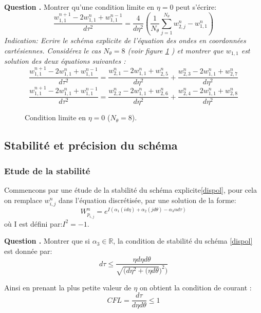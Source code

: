 \documentclass[a4,12pt]{article}
\newcounter{Nbquestion}
\newcommand*\question{%
\stepcounter{Nbquestion}%
\textbf{Question \theNbquestion. }}
\begin{document}
\begin{mdframed}[style=exampledefault]
\question Montrer qu'une condition limite en $\eta=0$ peut s'écrire:
\[
\dfrac{w_{1,1}^{n+1}-2 w_{1,1}^{n}+ w_{1,1}^{n-1}}{d\tau^2}=\dfrac{4}{d \eta^2}\left(\frac{1}{N_\theta} \sum_{j=1}^{N_\theta} w_{2,j}^n-w_{1,1}^{n}\right)
\]
\textit{Indication: Ecrire le schéma explicite de l'équation des ondes en coordonnées cartésiennes. Considérez le cas $N_\theta=8$ (voir figure \ref{fig:pol}  )
et montrer que $w_{1,1}$ est solution des deux équations suivantes :
$$\frac{w_{1,1}^{n+1}-2w_{1,1}^{n}+w_{1,1}^{n-1}}{d\tau^{2}}=\frac{w_{2,1}^{n}-2w_{1,1}^{n}+w_{2,5}^{n}}{d\eta^{2}}+ \frac{w_{2,3}^{n}-2w_{1,1}^{n}+w_{2,7}^{n}}{d\eta^{2}}
 $$
$$\frac{w_{1,1}^{n+1}-2w_{1,1}^{n}+w_{1,1}^{n-1}}{d\tau^{2}}=\frac{w_{2,2}^{n}-2w_{1,1}^{n}+w_{2,6}^{n}}{d\eta^{2}}+ \frac{w_{2,4}^{n}-2w_{1,1}^{n}+w_{2,8}^{n}}{d\eta^{2}}
 $$}
 \end{mdframed}

\begin{figure}[h]
	\begin{center}
		\caption{Condition limite en $\eta=0$ ($N_{\theta}=8$).}
		\label{fig:pol}
	\end{center}
\end{figure}
\subsection{Stabilité et précision du schéma}

\subsubsection{Etude de la stabilité}
Commencons par une étude de la stabilité du schéma explicite\ref{dispol}, pour cela on remplace $w_{i,j}^{n}$ dans l'équation discrétisée, par une solution de la forme: 
\[
W_{p_{i,j}}^{n}=e^{I(\alpha_1(id\eta)+\alpha_2(jd\theta)-\alpha_3 n d\tau)}
\]
où I est défini par:$I^2=-1$.


\begin{mdframed}[style=exampledefault]
\question  Montrer que si $\alpha_3\in \mathbb{R}$,  la condition de stabilité du schéma \ref{dispol} est donnée par:
$$d \tau\leq \dfrac{ \eta d\eta d\theta}{\sqrt{(d \eta^2+(\eta d\theta})^{2})}$$
\end{mdframed}
Ainsi en prenant la plus petite valeur de $\eta$  on obtient la condition de courant : 
\begin{equation}
 CFL=\frac{d \tau}{d \eta d \theta}\leq 1
	\label{eq:CFL}
\end{equation}
\end{document}
